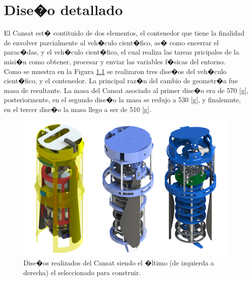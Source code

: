 \documentclass[10pt,a4paper]{book}
\begin{document}



\chapter{Dise�o detallado}
El Cansat est� contituido de dos elementos, el contenedor que tiene la finalidad de envolver parcialmente al veh�culo cient�fico, as� como encerrar el parac�das, y el veh�culo cient�fico, el cual realiza las tareas pricipales de la misi�n como obtener, procesar y enviar las variables f�sicas del entorno.\\

Como se muestra en la Figura \ref{img:DisenosCansat} se realizaron tres dise�os del veh�culo cient�fico, y el contenedor. La principal raz�n del cambio de geometr�a fue masa de resultante. La masa del Cansat asociado al primer dise�o era de 570 [g], posteriormente, en el segundo dise�o la masa se redujo a 530 [g], y finalemnte, en el tercer dise�o la masa llego a ser de 510 [g].

\begin{figure}[H]
	\centering
		\includegraphics[scale=0.45]{Imagenes/DisenosCansat.png}
	\caption{Dise�os realizados del Cansat siendo el �ltimo (de izquierda a derecha) el seleccionado para construir.}
	\label{img:DisenosCansat}
\end{figure}
\end{document}
